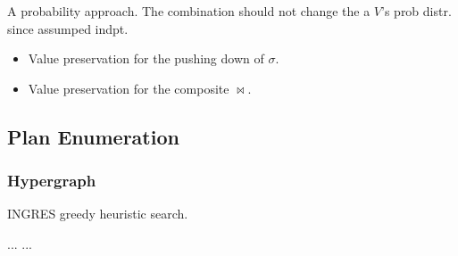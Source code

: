 \documentclass[a4paper]{report}
\begin{document}
A probability approach. The combination should not change the a $V$'s prob distr. since assumped indpt.
\begin{itemize}
\item Value preservation for the pushing down of $\sigma$. 
\item Value preservation for the composite $\bowtie$. 
\end{itemize}
\subsection{Plan Enumeration}
\subsubsection{Hypergraph}
INGRES greedy heuristic search. 

\begin{thebibliography}{99}
 ...
 ...
\end{thebibliography}
\end{document}
